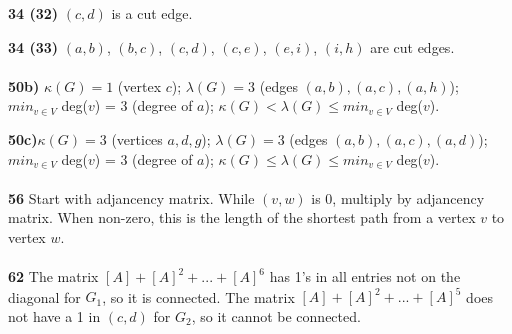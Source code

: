 \documentclass{article}
\begin{document}
\noindent\textbf{34 (32)} $(c,d)$ is a cut edge.

\noindent\textbf{34 (33)} $(a,b)$, $(b,c)$, $(c,d)$, $(c,e)$, $(e,i)$, $(i,h)$ are cut edges.
\\\\\noindent\textbf{50b)} $\kappa (G) = 1$ (vertex $c$); $\lambda (G) = 3$ (edges $(a,b),(a,c),(a,h)$); $min_{v\in V}$ deg($v$) = 3 (degree of $a$); $\kappa (G) < \lambda (G) \le min_{v\in V}$ deg($v$).

\noindent\textbf{50c)}$\kappa (G) = 3$ (vertices $a,d,g$); $\lambda (G) = 3$ (edges $(a,b),(a,c),(a,d)$); $min_{v\in V}$ deg($v$) = 3 (degree of $a$); $\kappa (G) \le \lambda (G) \le min_{v\in V}$ deg($v$).
\\\\\noindent\textbf{56} Start with adjancency matrix. While $(v,w)$ is 0, multiply by adjancency matrix. When non-zero, this is the length of the shortest path from a vertex $v$ to vertex $w$. 
\\\\\noindent\textbf{62} The matrix $[A]+[A]^2+...+[A]^6$ has 1's in all entries not on the diagonal for $G_1$, so it is connected. The matrix $[A]+[A]^2+...+[A]^5$ does not have a 1 in $(c,d)$ for $G_2$, so it cannot be connected. 
\end{document}
